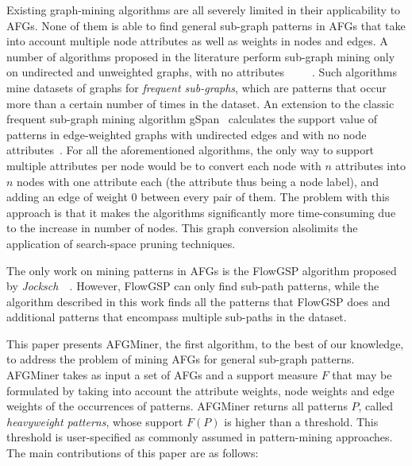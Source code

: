 Existing graph-mining algorithms are all severely limited in their applicability to AFGs. None of them is able to find general sub-graph patterns in AFGs that take into account multiple node attributes as well as weights in nodes and edges. A number of algorithms proposed in the literature perform sub-graph mining only on undirected and unweighted graphs, with no attributes~\cite{gSpan}~\cite{Gaston}~\cite{FFSM}~\cite{FSP}~\cite{AGM}. Such algorithms mine datasets of graphs for \emph{frequent sub-graphs}, which are patterns that occur more than a certain number of times in the dataset. An extension to the classic frequent sub-graph mining algorithm gSpan~\cite{gSpan} calculates the support value of patterns in edge-weighted graphs with undirected edges and with no node attributes~\cite{Jiang}. For all the aforementioned algorithms, the only way to support multiple attributes per node would be to convert each node with $n$ attributes into $n$ nodes with one attribute each (the attribute thus being a node label), and adding an edge of weight 0 between every pair of them. The problem with this approach is that it makes the algorithms significantly more time-consuming due to the increase in number of nodes. This graph conversion alsolimits the application of search-space pruning techniques.

The only work on mining patterns in AFGs is the FlowGSP algorithm proposed by \emph{Jocksch~\etal}~\cite{FlowGSP}. However, FlowGSP can only find sub-path patterns, while the algorithm described in this work finds all the patterns that FlowGSP does and additional patterns that encompass multiple sub-paths in the dataset.  

This paper presents AFGMiner, the first algorithm, to the best of our knowledge, to address the problem of mining AFGs for general sub-graph patterns. AFGMiner takes as input a set of AFGs and a support measure $F$ that may be formulated by taking into account the attribute weights, node weights and edge weights of the occurrences of patterns. AFGMiner returns all patterns $P$, called \emph{heavyweight patterns}, whose support $F(P)$ is higher than a threshold. This threshold is user-specified as commonly assumed in pattern-mining approaches.
The main contributions of this paper are as follows: 

